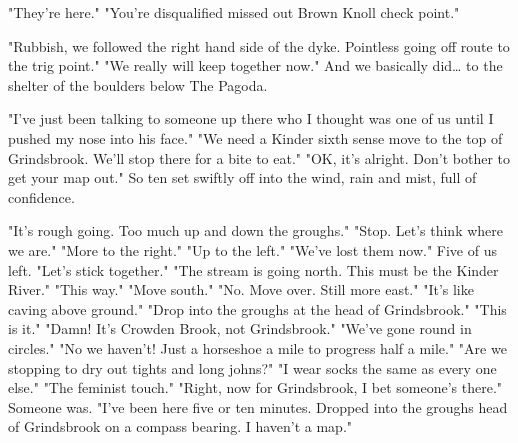 \documentclass[a5paper,openany,font 10pt]{scrbook}
\begin{document}
"They're here."
"You're disqualified   missed out Brown Knoll check point."

"Rubbish, we followed the right hand side of the dyke.
Pointless going off route to the trig point."
  "We really will keep together now."
And we basically did\ldots{} to the shelter of the boulders below
The Pagoda.

"I've just been talking to someone up there who I
thought was one of us until I pushed my nose into his
face."
"We need a Kinder sixth sense move to the top of
Grindsbrook. We'll stop there for a bite to eat."
"OK, it's alright. Don't bother to get your map out."
So ten set swiftly off into the wind, rain and mist, full of
confidence.

"It's rough going. Too much up and down the groughs."
"Stop. Let's think where we are."
"More to the right."
"Up to the left."
"We've lost them now."
Five of us left.
"Let's stick together."
"The stream is going north. This must be the Kinder
River."
"This way."
"Move south."
"No. Move over. Still more east."
"It's like caving above ground."
"Drop into the groughs at the head of Grindsbrook."
"This is it."
"Damn! It's Crowden Brook, not Grindsbrook."
"We've gone round in circles."
"No we haven't! Just a horseshoe   a mile to progress
half a mile."
"Are we stopping to dry out tights and long johns?"
"I wear socks the same as every one else."
"The feminist touch."
"Right, now for Grindsbrook, I bet someone's there."
Someone was.
"I've been here five or ten minutes. Dropped into the
groughs head of Grindsbrook on a compass bearing. I
haven't a map."
\end{document}
